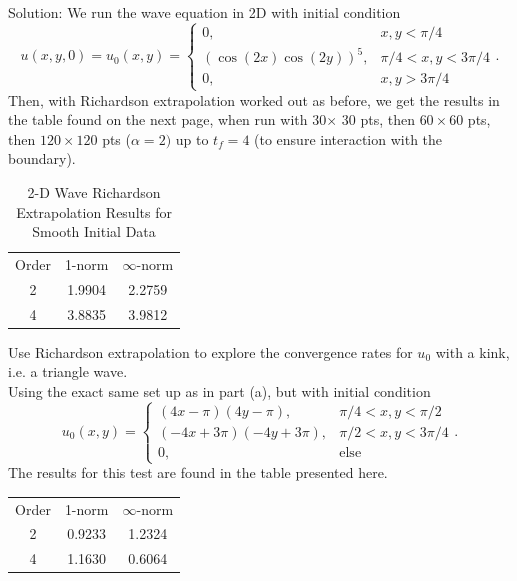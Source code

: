 Solution:
We run the wave equation in 2D with initial condition 
$$u(x,y,0)=u_0(x,y)=\left\{\begin{array}{cc}0,&x,y<\pi/4\\ (\cos(2x)\cos(2y))^5,&\pi/4<x,y<3\pi/4\\0,&x,y>3\pi/4\end{array}\right..$$
Then, with Richardson extrapolation worked out as before, we get the results in the table found on the next page, when run with 30$\times$ 30 pts, then $60\times60$ pts, then $120\times 120$ pts ($\alpha=2)$ up to $t_f=4$ (to ensure interaction with the boundary).
\begin{table}[h]
\centering
\begin{tabular}{c|c|c}
\hline
Order&1-norm&$\infty$-norm\\
2&1.9904&2.2759\\
4&3.8835&3.9812\\
\hline
\end{tabular}
\caption{2-D Wave Richardson Extrapolation Results for Smooth Initial Data}
\end{table}
\item Use Richardson extrapolation to explore the convergence rates for $u_0$ with a kink, i.e. a triangle wave.\\

Using the exact same set up as in part (a), but with initial condition
$$u_0(x,y)=\left\{\begin{array}{cc}(4x-\pi)(4y-\pi),&\pi/4<x,y<\pi/2\\ (-4x+3\pi)(-4y+3\pi),&\pi/2<x,y<3\pi/4\\0,&\text{else}\end{array}\right..$$
The results for this test are found in the table presented here.
\begin{table}[h]
\centering
\begin{tabular}{c|c|c}
\hline
Order&1-norm&$\infty$-norm\\
2&0.9233&1.2324\\
4&1.1630&0.6064\\
\hline
\end{tabular}
\end{table}

